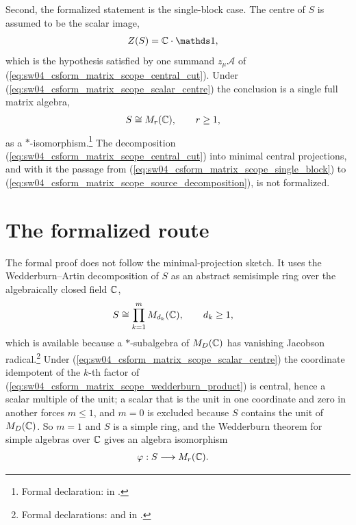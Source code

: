 \documentclass{article}
\begin{document}
Second, the formalized statement is the single-block case. The centre of $S$ is
assumed to be the scalar image,
\begin{align}
    Z(S)
        &=\C\cdot\one,
    \label{eq:sw04_csform_matrix_scope_scalar_centre}
\end{align}
which is the hypothesis satisfied by one summand $z_\mu\mathcal A$ of
(\ref{eq:sw04_csform_matrix_scope_central_cut}). Under
(\ref{eq:sw04_csform_matrix_scope_scalar_centre}) the conclusion is a single
full matrix algebra,
\begin{align}
    S
        &\cong M_{r}(\mathbb{C}),
        \qquad r\geq 1,
    \label{eq:sw04_csform_matrix_scope_single_block}
\end{align}
as a $*$-isomorphism.\footnote{Formal declaration:
 in
.}
The decomposition
(\ref{eq:sw04_csform_matrix_scope_central_cut}) into minimal central
projections, and with it the passage from
(\ref{eq:sw04_csform_matrix_scope_single_block}) to
(\ref{eq:sw04_csform_matrix_scope_source_decomposition}), is not formalized.

\section{The formalized route}

The formal proof does not follow the minimal-projection sketch. It uses the
Wedderburn--Artin decomposition of $S$ as an abstract semisimple ring over the
algebraically closed field $\mathbb{C}$,
\begin{align}
    S
        &\cong\prod_{k=1}^{m}M_{d_k}(\mathbb{C}),
        \qquad d_k\geq 1,
    \label{eq:sw04_csform_matrix_scope_wedderburn_product}
\end{align}
which is available because a $*$-subalgebra of $M_{D}(\mathbb{C})$ has vanishing Jacobson
radical.\footnote{Formal declarations: 
and  in
.}
Under (\ref{eq:sw04_csform_matrix_scope_scalar_centre}) the coordinate
idempotent of the $k$-th factor of
(\ref{eq:sw04_csform_matrix_scope_wedderburn_product}) is central, hence a
scalar multiple of the unit; a scalar that is the unit in one coordinate and
zero in another forces $m\leq 1$, and $m=0$ is excluded because $S$ contains
the unit of $M_{D}(\mathbb{C})$. So $m=1$ and $S$ is a simple ring, and the Wedderburn
theorem for simple algebras over $\mathbb{C}$ gives an algebra isomorphism
\begin{align}
    \varphi
        &:S\longrightarrow M_{r}(\mathbb{C}).
    \label{eq:sw04_csform_matrix_scope_algebra_isomorphism}
\end{align}
\end{document}
